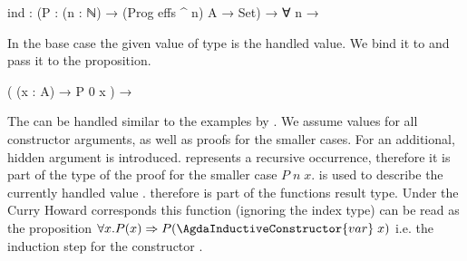 \begin{code}
ind : (P : (n : ℕ) → (Prog effs ^ n) A → Set) → ∀ n →
\end{code}
In the base case the given value of type  is the handled value.
We bind it to  and pass it to the proposition.
\begin{code}
  (                (x : A)                                        → P 0 x                     )  →
\end{code}
The  can be handled similar to the examples by
\textcite{DBLP:journals/corr/abs-1806-05230}.
We assume values for all constructor arguments, as well as proofs for the
smaller cases.
For  an additional, hidden argument
 is introduced.
 represents a recursive occurrence, therefore it is part of the
type of the proof for the smaller case $P\;n\;x$.
 is used to describe the currently handled value
\AgdaSpace{}.
\AgdaSpace{} therefore is part of
the functions result type.
Under the Curry Howard corresponds this function (ignoring the index type) can
be read as the proposition
$\forall x. P(x) \Rightarrow P(\AgdaInductiveConstructor{var}\;x)$
i.e. the induction step for the constructor .
